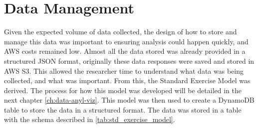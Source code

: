 \section{\label{sec:data-mgmt}Data Management}
Given the expected volume of data collected, the design of how to store and manage this data was important to ensuring analysis could happen quickly, and AWS costs remained low. Almost all the data stored was already provided in a structured JSON format, originally these data responses were saved and stored in AWS S3. This allowed the researcher time to understand what data was being collected, and what was important. From this, the Standard Exercise Model was derived. The process for how this model was developed will be detailed in the next chapter \ref{ch:data-anyl-viz}. This model was then used to create a DynamoDB table to store the data in a structured format. The data was stored in a table with the schema described in \autoref{tab:std_exercise_model}.
\begin{table}[h]
  \centering
  \caption[Standard Exercise Model Schema]{\label{tab:std_exercise_model}The schema for the "Standard Exercise Model"}
\end{table}

